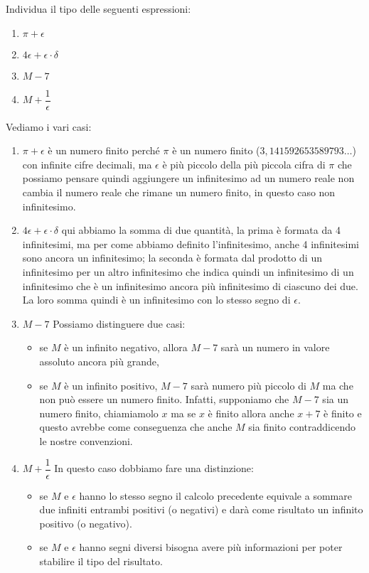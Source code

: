 \newpage %

\begin{esempio}
 Individua il tipo delle seguenti espressioni:

\begin{multicols}{4}
\begin{enumerate} [nosep]
 \item \(\pi+\epsilon\)
 \item \(4\epsilon+\epsilon \cdot \delta\)
 \item \(M-7\)
 \item \(M+\dfrac{1}{\epsilon}\)
\end{enumerate}
\end{multicols}

Vediamo i vari casi:

\begin{enumerate}
 \item \(\pi+\epsilon\) 
è un numero finito perché \(\pi\) è un numero 
finito (\(3,141592653589793\dots\)) con infinite cifre decimali, ma 
\(\epsilon\) è più piccolo della più piccola cifra di \(\pi\) che possiamo 
pensare quindi aggiungere un infinitesimo ad un numero reale non cambia il 
numero reale che rimane un numero finito, in questo caso non infinitesimo.
 \item  \(4\epsilon+\epsilon \cdot \delta\) 
qui abbiamo la somma di due quantità, 
la prima è formata da 4 infinitesimi, ma per come abbiamo definito 
l'infinitesimo, anche 4 infinitesimi sono ancora un infinitesimo; la 
seconda è formata dal prodotto di un infinitesimo per un altro infinitesimo 
che indica quindi un infinitesimo di un infinitesimo che è un infinitesimo 
ancora più infinitesimo di ciascuno dei due. La loro somma quindi è un 
infinitesimo con lo stesso segno di \(\epsilon\).
 \item \(M-7\)
Possiamo distinguere due casi: 
 \begin{itemize} [noitemsep]
  \item se \(M\) è un infinito negativo, allora 
\(M-7\) sarà un numero in valore assoluto ancora più grande, 
 \item se \(M\) è un infinito positivo, \(M-7\) sarà numero più piccolo di 
\(M\) ma che non può essere un numero finito. 
Infatti, supponiamo che \(M-7\) sia un numero finito, chiamiamolo \(x\) ma 
se \(x\) è finito allora anche \(x+7\) è finito e questo avrebbe come 
conseguenza che anche \(M\) sia finito contraddicendo le nostre convenzioni.
 \end{itemize}
 \item \(M+\dfrac{1}{\epsilon}\)
 In questo caso dobbiamo fare una distinzione:
 \begin{itemize} [noitemsep]
  \item se \(M\) e \(\epsilon\) hanno lo stesso segno il calcolo precedente 
equivale a sommare due infiniti entrambi positivi (o negativi) e darà come 
risultato un infinito positivo (o negativo).
  \item se \(M\) e \(\epsilon\) hanno segni diversi bisogna avere più 
informazioni per poter stabilire il tipo del risultato.
 \end{itemize}


\end{enumerate}
\end{esempio}

